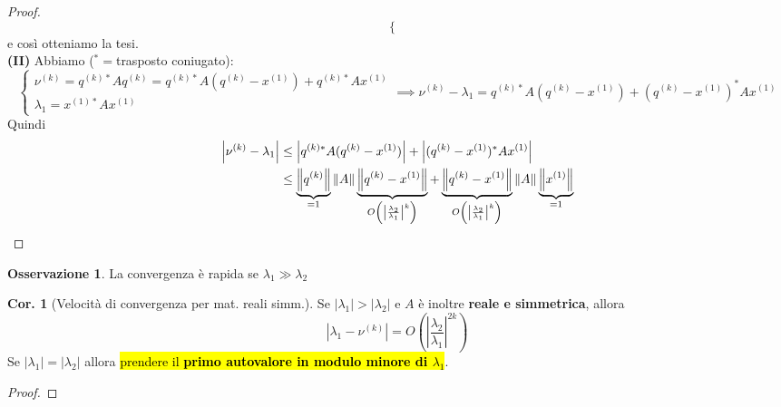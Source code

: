 \documentclass[a4paper,10pt]{article}
\theoremstyle{definition}
\theoremstyle{indentdefinition}
\theoremstyle{indenttheorem}
\newtheorem{cor}{Cor.}
\theoremstyle{myremark}
\newtheorem*{rem*}{Osservazione}
\theoremstyle{indentgeneral}
\theoremstyle{plain}
\theoremstyle{plain}
\newenvironment{myboxed} 
{\noindent\begin{lrbox}{\mybox}\begin{minipage}{\textwidth}}
{\end{minipage}\end{lrbox}\fbox{\usebox{\mybox}}}
\begin{document}
\begin{proof}
$$\begin{cases}
\end{cases}$$
e così otteniamo la tesi.\\
\textbf{(II)} Abbiamo ($^*=$trasposto coniugato):
$$\begin{cases}
    \nu^{(k)}=q^{(k)*}Aq^{(k)}=q^{(k)*}A(q^{(k)}-x^{(1)})+q^{(k)*}Ax^{(1)}\\
    \lambda_1=x^{(1)*}Ax^{(1)}
\end{cases}\implies \nu^{(k)}-\lambda_1=q^{(k)*}A(q^{(k)}-x^{(1)})+(q^{(k)}-x^{(1)})^*Ax^{(1)}$$
Quindi
\begin{align*}
    \abs{\nu^{(k)}-\lambda_1}&\le \abs{q^{(k)*}A(q^{(k)}-x^{(1)})} + \abs{(q^{(k)}-x^{(1)})^*Ax^{(1)}}\\
    &\le \underbrace{\norm{q^{(k)}}}_{=1}\norm{A}\underbrace{\norm{q^{(k)}-x^{(1)}}}_{O\left(\abs{\frac{\lambda_{2}}{\lambda_{1}}}^{k}\right)}+\underbrace{\norm{q^{(k)}-x^{(1)}}}_{O\left(\abs{\frac{\lambda_{2}}{\lambda_{1}}}^{k}\right)}\norm{A}\underbrace{\norm{x^{(1)}}}_{=1}
\end{align*}
\end{proof}

\begin{rem*}
    La convergenza è rapida se $\lambda_1\gg \lambda_2$
\end{rem*}

\begin{myboxed}
\begin{cor}[Velocità di convergenza per mat. reali simm.]
Se $\left|\lambda_{1}\right|>\left|\lambda_{2}\right|$ e $A$ è inoltre \textbf{reale e simmetrica}, allora 
$$\left|\lambda_{1}-\nu^{\left(k\right)}\right|=O\left(\left|\frac{\lambda_{2}}{\lambda_{1}}\right|^{2k}\right)$$
Se $\left|\lambda_{1}\right|=\left|\lambda_{2}\right|$ allora \hl{prendere il \textbf{primo autovalore in modulo minore di $\lambda_1$}}.
\end{cor}
\end{myboxed}

\begin{proof}
\end{proof}
\end{document}
